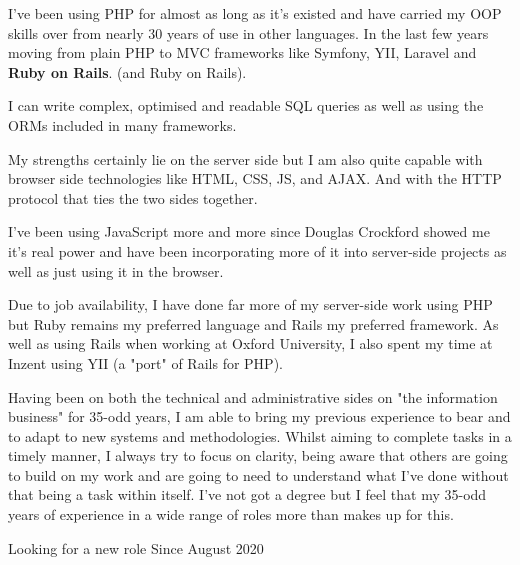 \topHeading{}



I've been using PHP for almost as long as it's existed
and have carried my OOP skills over from nearly 30 years
of use in other languages.
In the last few years moving from plain PHP to MVC frameworks
like Symfony, YII, Laravel
\ifnum{}
and \textbf{Ruby on Rails}.
\else
(and Ruby on Rails).
\fi

I can write complex, optimised and readable SQL queries
as well as using the ORMs included in many frameworks.

\ifnum{}
    My strengths certainly lie on the server side
    but I am also quite capable with browser side
    technologies like HTML, CSS, JS, and AJAX.
    And with the HTTP protocol that ties the two sides together.
\fi

\ifnum{}
    I've been using JavaScript more and more since Douglas Crockford
    showed me it's real power and have been incorporating more of it
    into server-side projects as well as just using it in the browser.
\fi

\ifnum{}
    Due to job availability, I have done far more of my server-side work
    using PHP but Ruby remains my preferred language
    and Rails my preferred framework.
    As well as using Rails when working at Oxford University,
    I also spent my time at Inzent using YII (a "port" of Rails for PHP).
\fi

\ifnum{}
    Having been on both the technical and administrative sides on
    "the information business" for 35-odd years,
    I am able to bring my previous experience to bear and to adapt
    to new systems and methodologies.
    Whilst aiming to complete tasks in a timely manner,
    I always try to focus on clarity,
    being aware that others are going to build on my work
    and are going to need to understand what I've done
    without that being a task within itself.
\else
    I've not got a degree but I feel that my 35-odd years of
    experience in a wide range of roles more than makes up for this.
\fi


\jobHeading
    {Looking for a new role}
    {Since August 2020}

